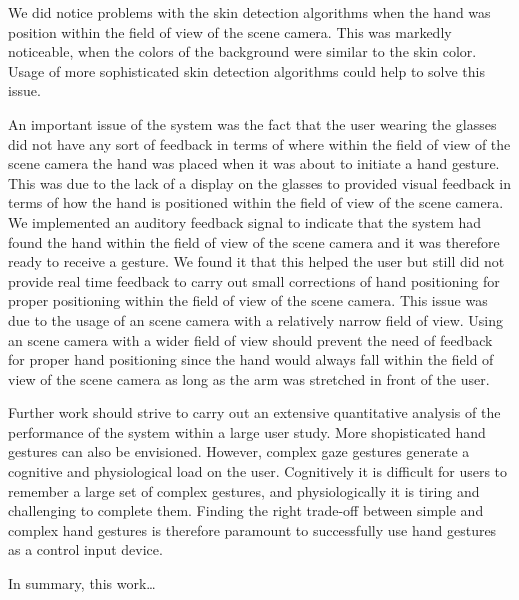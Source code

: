 \documentclass[jou,a4paper,notxfonts]{apa}
\begin{document}
We did notice problems with the skin detection algorithms when the hand was position within the field of view of the
scene camera. This was markedly noticeable, when the colors of the background were similar to the skin color. Usage of
more sophisticated skin detection algorithms could help to solve this issue.


An important issue of the system was the fact that the user wearing the glasses did not have any sort of feedback in
terms of where within the field of view of the scene camera the hand was placed when it was about to initiate a hand
gesture. This was due to the lack of a display on the glasses to provided visual feedback in terms of how the hand is
positioned within the field of view of the scene camera. We implemented an auditory feedback signal to indicate
that the system had found the hand within the field of view of the scene camera and it was therefore ready to receive a
gesture. We found it that this helped the user but still did not provide real time feedback to carry out small
corrections of hand positioning for proper positioning within the field of view of the scene camera. This issue was due
to the usage of an scene camera with a relatively narrow field of view. Using an scene camera with a wider field of view
should prevent the need of feedback for proper hand positioning since the hand would always fall within the field of
view of the scene camera as long as the arm was stretched in front of the user.


Further work should strive to carry out an extensive quantitative analysis of the performance of the system within a
large user study. More shopisticated hand gestures can also be envisioned. However, complex gaze gestures generate a
cognitive and physiological load on the user. Cognitively it is difficult for users to remember a large set of complex
gestures, and physiologically it is tiring and challenging to complete them. Finding the right trade-off between simple
and complex hand gestures is therefore paramount to successfully use hand gestures as a control input device.


In summary, this work\ldots



\end{document}

